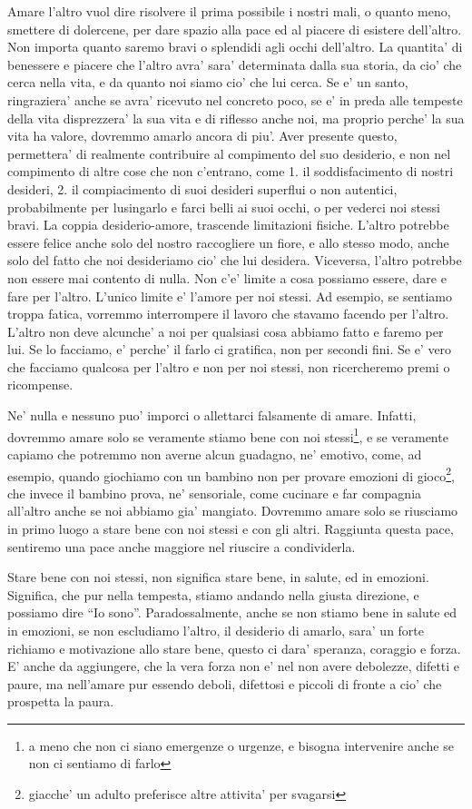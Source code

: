 Amare l'altro vuol dire risolvere il prima possibile i nostri mali, o quanto meno, smettere di dolercene, per dare spazio alla pace ed al piacere di esistere dell'altro. Non importa quanto saremo bravi o splendidi agli occhi dell'altro. 
La quantita' di benessere e piacere che l'altro avra' sara' determinata dalla sua storia, da cio' che cerca nella vita, e da quanto noi siamo cio' che lui cerca.
Se e' un santo, ringraziera' anche se avra' ricevuto nel concreto poco, se e' in preda alle tempeste della vita disprezzera' la sua vita e di riflesso anche noi, ma proprio perche' la sua vita ha valore, dovremmo amarlo ancora di piu'.
Aver presente questo, permettera' di realmente contribuire al compimento del suo desiderio, e non nel compimento di altre cose che non c'entrano, come 1. il soddisfacimento di nostri desideri, 2. il compiacimento di suoi desideri superflui o non autentici, probabilmente per lusingarlo e farci belli ai suoi occhi, o per vederci noi stessi bravi.
La coppia desiderio-amore, trascende limitazioni fisiche. L'altro potrebbe essere felice anche solo del nostro raccogliere un fiore, e allo stesso modo, anche solo del fatto che noi desideriamo cio' che lui desidera. Viceversa, l'altro potrebbe non essere mai contento di nulla.
Non c'e' limite a cosa possiamo essere, dare e fare per l'altro. L'unico limite e' l'amore per noi stessi. Ad esempio, se sentiamo troppa fatica, vorremmo interrompere il lavoro che stavamo facendo per l'altro.
L'altro non deve alcunche' a noi per qualsiasi cosa abbiamo fatto e faremo per lui. Se lo facciamo, e' perche' il farlo ci gratifica, non per secondi fini. Se e' vero che facciamo qualcosa per l'altro e non per noi stessi, non ricercheremo premi o ricompense.

Ne' nulla e nessuno puo' imporci o allettarci falsamente di amare. Infatti, dovremmo amare solo se veramente stiamo bene con noi stessi\footnote{a meno che non ci siano emergenze o urgenze, e bisogna intervenire anche se non ci sentiamo di farlo}, e se veramente capiamo che potremmo non averne alcun guadagno, ne' emotivo, come, ad esempio, quando giochiamo con un bambino non per provare emozioni di gioco\footnote{giacche' un adulto preferisce altre attivita' per svagarsi}, che invece il bambino prova, ne' sensoriale, come cucinare e far compagnia all'altro anche se noi abbiamo gia' mangiato. Dovremmo amare solo se riusciamo in primo luogo a stare bene con noi stessi e con gli altri. Raggiunta questa pace, sentiremo una pace anche maggiore nel riuscire a condividerla.

Stare bene con noi stessi, non significa stare bene, in salute, ed in emozioni. Significa, che pur nella tempesta, stiamo andando nella giusta direzione, e possiamo dire ``Io sono''. Paradossalmente, anche se non stiamo bene in salute ed in emozioni, se non escludiamo l'altro, il desiderio di amarlo, sara' un forte richiamo e motivazione allo stare bene, questo ci dara' speranza, coraggio e forza. 
E' anche da aggiungere, che la vera forza non e' nel non avere debolezze, difetti e paure, ma nell'amare pur essendo deboli, difettosi e piccoli di fronte a cio' che prospetta la paura.

